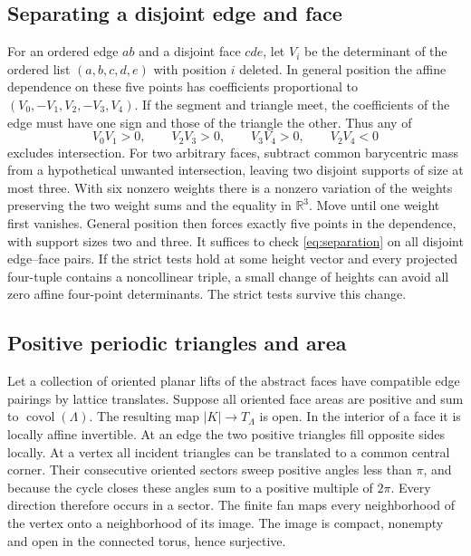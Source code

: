 \documentclass[11pt,letterpaper]{amsart}
\newcommand{\R}{\mathbb R}
\newcommand{\covol}{\operatorname{covol}}
\begin{document}
\subsection*{Separating a disjoint edge and face}

For an ordered edge \(ab\) and a disjoint face \(cde\), let \(V_i\)
be the determinant of the ordered list \((a,b,c,d,e)\) with position
\(i\) deleted. In general position the affine dependence on these
five points has coefficients proportional to
\((V_0,-V_1,V_2,-V_3,V_4)\). If the segment and triangle meet, the
coefficients of the edge must have one sign and those of the triangle
the other. Thus any of
\[
 V_0V_1>0,\qquad V_2V_3>0,\qquad V_3V_4>0,\qquad V_2V_4<0
 \tag{1}\label{eq:separation}
\]
excludes intersection. For two arbitrary faces, subtract common
barycentric mass from a hypothetical unwanted intersection, leaving
two disjoint supports of size at most three. With six nonzero weights
there is a nonzero variation of the weights preserving the two
weight sums and the equality in \(\R^3\). Move until one weight first
vanishes. General position then forces exactly five points in the
dependence, with support sizes two and three. It suffices to check
\eqref{eq:separation} on all disjoint edge--face pairs. If the
strict tests hold at some height vector and every projected
four-tuple contains a noncollinear triple, a small change of heights
can avoid all zero affine four-point determinants. The strict tests
survive this change.

\subsection*{Positive periodic triangles and area}

Let a collection of oriented planar lifts of the abstract faces
have compatible edge pairings by lattice translates. Suppose all
oriented face areas are positive and sum to \(\covol(\Lambda)\).
The resulting map \(|K|\to T_\Lambda\) is open. In the interior of
a face it is locally affine invertible. At an edge the two positive
triangles fill opposite sides locally. At a vertex all incident
triangles can be translated to a common central corner. Their
consecutive oriented sectors sweep positive angles less than \(\pi\),
and because the cycle closes these angles sum to a positive multiple
of \(2\pi\). Every direction therefore occurs in a sector. The
finite fan maps every neighborhood of the vertex onto a
neighborhood of its image. The image is compact, nonempty and
open in the connected torus, hence surjective.
\end{document}
